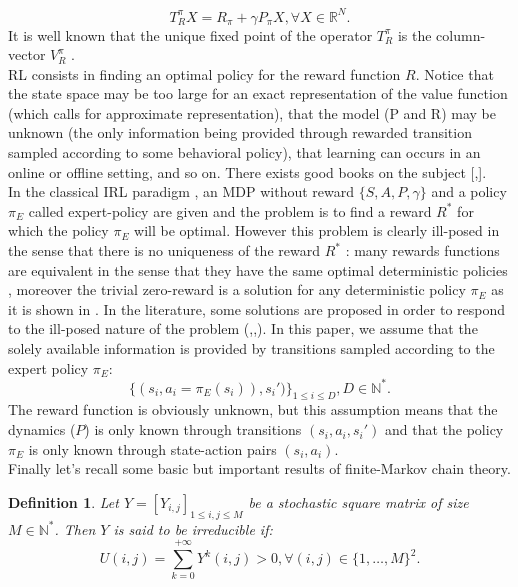 \documentclass{article} %
\newtheorem{definition}{Definition}
\newcommand{\0}{\mathbf{0}}
\newcommand{\1}{\mathbf{1}}
\begin{document}
\begin{equation}
T^\pi_RX=R_\pi+\gamma P_\pi X , \forall X\in \mathbb{R}^N.
\end{equation}
It is well known that the unique fixed point of the operator $T^\pi_R$ is the column-vector $V^\pi_R$ \cite{puterman1994markov}.\\
RL consists in finding an optimal policy for the reward function $R$. Notice that the state space may be too large for an exact representation of the value function (which calls for approximate
representation), that the model (P and R) may be unknown (the only information being provided through rewarded transition sampled according
to some behavioral policy), that learning can occurs in an online or offline setting, and so on. There exists good books on the subject [\cite{bertsekas2001dynamic},\cite{sutton1998reinforcement}].\\
In the classical IRL paradigm \cite{ng2000algorithms}, an MDP without reward $\{S,A,P,\gamma\}$ and a policy $\pi_E$ called expert-policy are given and the problem is to find
a reward $R^*$ for which the policy $\pi_E$ will be optimal. However this problem is clearly ill-posed in the sense that there is no uniqueness of the reward $R^*$ : many rewards functions are equivalent in the sense that they have the same optimal deterministic policies \cite{ng1999policyreward}, moreover the trivial zero-reward is a solution for any deterministic policy $\pi_E$ as it is shown in \cite{ng2000algorithms}. In the literature, some solutions are proposed in order to respond to the ill-posed nature of the problem (\cite{ng2000algorithms},\cite{ziebart2008maximum},\cite{boularias2011relative}).
In this paper, we assume that the solely available information is provided by transitions sampled according to the expert policy $\pi_E$:
\begin{equation}
\label{equation:data}
\{(s_i,a_i=\pi_E(s_i)),s_i')\}_{1\leq i \leq D}, D\in\mathbb{N}^*.
\end{equation}
The reward function is obviously unknown, but this assumption means that the dynamics ($P$) is only known through transitions $(s_i, a_i, s_i')$ and that the
policy $\pi_E$ is only known through state-action pairs $(s_i, a_i)$.\\
Finally let's recall some basic but important results of finite-Markov chain theory.
\begin{definition}
Let $Y=[Y_{i,j}]_{1\leq i,j \leq M}$ be a  stochastic square matrix of size $M\in\mathbb{N}^*$. Then $Y$ is said to be irreducible if:
\begin{equation}
U(i,j)=\sum_{k=0}^{+\infty}Y^k(i,j)>0 ,\forall (i,j)\in \{1,\dots,M\}^2.
\end{equation}
\end{definition}
\end{document}
